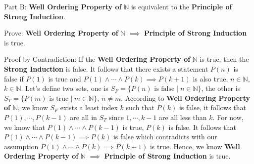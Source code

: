 \begin{flushleft}
Part B: \textbf{Well Ordering Property of} $\mathbb{N}$ is equivalent to the 
\textbf{Principle of Strong Induction}. \\
\vspace{10px}

Prove: \textbf{Well Ordering Property of} $\mathbb{N}$ $\implies$ 
\textbf{Principle of Strong Induction} is true. \\
\vspace{10px}

Proof by Contradiction: If the \textbf{Well Ordering Property of} $\mathbb{N}$ 
is true, then the \textbf{Strong Induction} is false. It follows that there 
exists a statement $P(n)$ is false if $P(1)$ is true and $P(1) \land \cdots 
\land P(k) \implies P(k + 1)$ is also true, $n \in \mathbb{N}$, $k \in 
\mathbb{N}$. Let's define two sets, one is $S_F = \{P(n) \text{ is false } |\ 
n \in \mathbb{N} \}$, the other is $S_T = \{ P(m) \text{ is true } |\ m \in 
\mathbb{N} \}$, $n \ne m$. According to \textbf{Well Ordering Property of} 
$\mathbb{N}$, we know $S_F$ exists a least index $k$ such that $P(k)$ is false, 
it follows that $P(1), \cdots, P(k - 1)$ are all in $S_T$ since $1, \cdots, 
k - 1$ are all less than $k$. For now, we know that $P(1) \land \cdots \land 
P(k - 1)$ is true,  $P(k)$ is false. It follows that $P(1) \land \cdots \land 
P(k - 1) \implies P(k)$ is false which contradicts with our assumption $P(1) 
\land \cdots \land P(k) \implies P(k + 1)$ is true. Hence, we know \textbf{Well 
Ordering Property of} $\mathbb{N}$ $\implies$ \textbf{Principle of Strong 
Induction} is true.
\end{flushleft}

